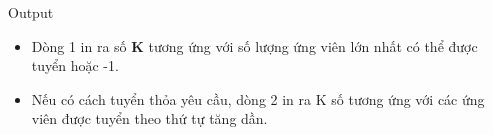 Output
\begin{itemize}
	\item Dòng 1 in ra số \textbf{ K } tương ứng với số lượng ứng viên lớn nhất có thể được tuyển hoặc -1.
	\item Nếu có cách tuyển thỏa yêu cầu, dòng 2 in ra K số tương ứng với các ứng viên được tuyển theo thứ tự tăng dần.
\end{itemize}